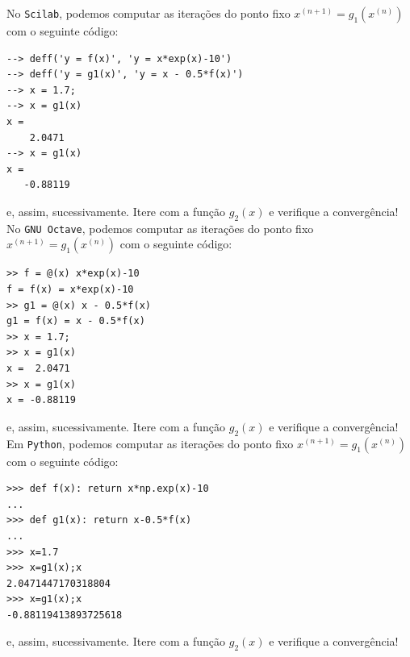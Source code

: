 \begin{ex}
\ifisscilab
No \verb+Scilab+, podemos computar as iterações do ponto fixo $x^{(n+1)} = g_1(x^{(n)})$ com o seguinte código:
\begin{verbatim}
--> deff('y = f(x)', 'y = x*exp(x)-10')
--> deff('y = g1(x)', 'y = x - 0.5*f(x)')
--> x = 1.7;
--> x = g1(x)
x =
    2.0471
--> x = g1(x)
x =
   -0.88119
\end{verbatim}
e, assim, sucessivamente. Itere com a função $g_2(x)$ e verifique a convergência!
\fi
\ifisoctave
No \verb+GNU Octave+, podemos computar as iterações do ponto fixo $x^{(n+1)} = g_1(x^{(n)})$ com o seguinte código:
\begin{verbatim}
>> f = @(x) x*exp(x)-10
f = f(x) = x*exp(x)-10
>> g1 = @(x) x - 0.5*f(x)
g1 = f(x) = x - 0.5*f(x)
>> x = 1.7;
>> x = g1(x)
x =  2.0471
>> x = g1(x)
x = -0.88119
\end{verbatim}
e, assim, sucessivamente. Itere com a função $g_2(x)$ e verifique a convergência!
\fi
\ifispython
Em \verb+Python+, podemos computar as iterações do ponto fixo $x^{(n+1)} = g_1(x^{(n)})$ com o seguinte código:
\begin{verbatim}
>>> def f(x): return x*np.exp(x)-10
...
>>> def g1(x): return x-0.5*f(x)
...
>>> x=1.7
>>> x=g1(x);x
2.0471447170318804
>>> x=g1(x);x
-0.88119413893725618
\end{verbatim}
e, assim, sucessivamente. Itere com a função $g_2(x)$ e verifique a convergência!
\fi
\end{ex}








